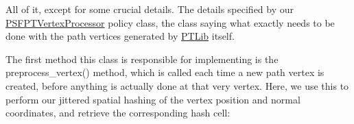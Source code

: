\begin{DoxyParagraph}{}
All of it, except for some crucial details. The details specified by our \hyperlink{struct_p_s_f_p_t_vertex_processor}{P\+S\+F\+P\+T\+Vertex\+Processor} policy class, the class saying what exactly needs to be done with the path vertices generated by \hyperlink{_p_t_lib_page}{P\+T\+Lib} itself.
\end{DoxyParagraph}
\begin{DoxyParagraph}{}
The first method this class is responsible for implementing is the preprocess\+\_\+vertex() method, which is called each time a new path vertex is created, before anything is actually done at that very vertex. Here, we use this to perform our jittered spatial hashing of the vertex position and normal coordinates, and retrieve the corresponding hash cell\+:
\end{DoxyParagraph}

